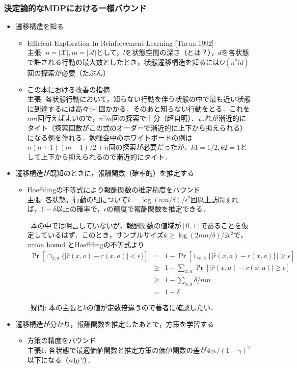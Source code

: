 \documentclass{jsarticle}
\begin{document}
\subsubsection*{決定論的なMDPにおける一様バウンド}
\begin{itemize}
\item{遷移構造を知る}
\begin{itemize}
\item{Efficient Exploration In Reinforcement
Learning [Thrun 1992]\\}
主張: $n=|\mathcal{X}|, m=|\mathcal{A}|$として，$l$を状態空間の深さ（とは？），$d$を各状態で許される行動の最大数としたとき，状態遷移構造を知るには$O(n^2ld)$回の探索が必要（たぶん）

\item{この本における改善の指摘\\}
主張: 各状態行動において，知らない行動を伴う状態の中で最も近い状態に到達するには高々n-1回かかる．そのあと知らない行動をとる．これを$nm$回行えばよいので，$n^2m$回の探索で十分（超自明）．これが漸近的にタイト（探索回数がこの式のオーダーで漸近的に上下から抑えられる）になる例を作れる．勉強会中のホワイトボードの例は$n(n+1)(m-1)/2 + n$回の探索が必要だったが、$k1=1/2,k2=1$として上下から抑えられるので漸近的にタイト．
\end{itemize}
\item{遷移構造が既知のときに，報酬関数（確率的）を推定する}
\begin{itemize}
\item{Hoeffdingの不等式により報酬関数の推定精度をバウンド\\}
主張: 各状態，行動の組について$k=\log(nm/\delta) / \epsilon^2$回以上訪問すれば，$1-\delta$以上の確率で，$\epsilon$の精度で報酬関数を推定できる．

\ 本の中では明言していないが，報酬関数の値域が$[0,1]$であることを仮定しているはず．このとき，サンプルサイズ$k\ge \log(2nm/\delta)/2\epsilon^2$で，union bound とHoeffdingの不等式より
\begin{eqnarray*}
\Pr[\cap_{x,a} \{|\hat{r}(x,a) - r(x,a)| < \epsilon\}] &=& 1 - \Pr[\cup_{x,a} \{|\hat{r}(x,a) - r(x,a)\}| \ge \epsilon]\\
&\ge& 1- \sum_{x,a}\Pr[|\hat{r}(x,a) - r(x,a)| \ge \epsilon]\\
&\ge& 1-\sum_{x,a}\delta/nm\\
&=& 1- \delta
\end{eqnarray*}

\ 疑問: 本の主張と$k$の値が定数倍違うので著者に確認したい．
\end{itemize}
\item {遷移構造が分かり，報酬関数を推定したあとで，方策を学習する}
\begin{itemize}
\item{方策の精度をバウンド\\}
主張1: 各状態で最適価値関数と推定方策の価値関数の差が$4\gamma\epsilon/(1-\gamma)^2$以下になる（why?）．


\end{itemize}
\end{itemize}
\end{document}
